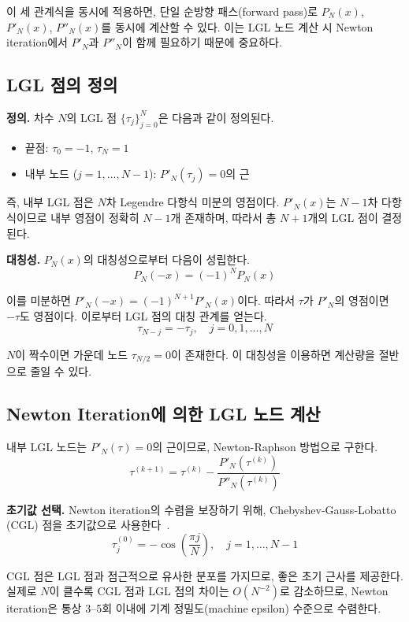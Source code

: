 \documentclass[11pt]{article}
\begin{document}
이 세 관계식을 동시에 적용하면, 단일 순방향 패스(forward pass)로 $P_N(x)$, $P'_N(x)$, $P''_N(x)$를 동시에 계산할 수 있다. 이는 LGL 노드 계산 시 Newton iteration에서 $P'_N$과 $P''_N$이 함께 필요하기 때문에 중요하다.

\subsection{LGL 점의 정의}
\label{sec:lgl_def}

\textbf{정의.} 차수 $N$의 LGL 점 $\{\tau_j\}_{j=0}^{N}$은 다음과 같이 정의된다.
\begin{itemize}[nosep]
  \item 끝점: $\tau_0 = -1$, $\tau_N = 1$
  \item 내부 노드 ($j = 1, \ldots, N-1$): $P'_N(\tau_j) = 0$의 근
\end{itemize}

즉, 내부 LGL 점은 $N$차 Legendre 다항식 미분의 영점이다. $P'_N(x)$는 $N-1$차 다항식이므로 내부 영점이 정확히 $N-1$개 존재하며, 따라서 총 $N+1$개의 LGL 점이 결정된다.

\textbf{대칭성.} $P_N(x)$의 대칭성으로부터 다음이 성립한다.
\[
P_N(-x) = (-1)^N P_N(x)
\]

이를 미분하면 $P'_N(-x) = (-1)^{N+1} P'_N(x)$이다. 따라서 $\tau$가 $P'_N$의 영점이면 $-\tau$도 영점이다. 이로부터 LGL 점의 대칭 관계를 얻는다.
\[
\tau_{N-j} = -\tau_j, \quad j = 0, 1, \ldots, N
\]

$N$이 짝수이면 가운데 노드 $\tau_{N/2} = 0$이 존재한다. 이 대칭성을 이용하면 계산량을 절반으로 줄일 수 있다.

\subsection{Newton Iteration에 의한 LGL 노드 계산}
\label{sec:newton}

내부 LGL 노드는 $P'_N(\tau) = 0$의 근이므로, Newton-Raphson 방법으로 구한다.
\[
\tau^{(k+1)} = \tau^{(k)} - \frac{P'_N(\tau^{(k)})}{P''_N(\tau^{(k)})}
\]

\textbf{초기값 선택.} Newton iteration의 수렴을 보장하기 위해, Chebyshev-Gauss-Lobatto (CGL) 점을 초기값으로 사용한다~\cite{Fahroo2002}.
\[
\tau_j^{(0)} = -\cos\!\left(\frac{\pi j}{N}\right), \quad j = 1, \ldots, N-1
\]

CGL 점은 LGL 점과 점근적으로 유사한 분포를 가지므로, 좋은 초기 근사를 제공한다. 실제로 $N$이 클수록 CGL 점과 LGL 점의 차이는 $O(N^{-2})$로 감소하므로, Newton iteration은 통상 3--5회 이내에 기계 정밀도(machine epsilon) 수준으로 수렴한다.
\end{document}
